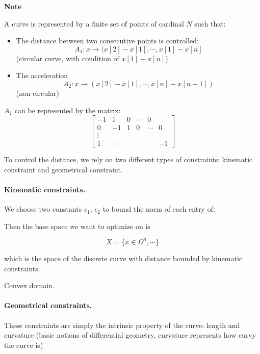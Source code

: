 \documentclass[11pt]{article}
\begin{document}
\setcounter{section}{0}
\thispagestyle{empty}

\begin{center}
{\LARGE \bf Note}\\
\end{center}
A curve is represented by a finite set of points of cardinal $N$ such that:

\begin{itemize}
\item The distance between two consecutive points is controlled:
\[A_1 : x \to (x[2]-x[1], \cdots, x[1]-x[n] \]
(circular curve, with condition of $x[1]-x[n]$)

\item The acceleration
\[A_2: x \to (x[2] - x[1], \cdots, x[n] - x[n-1])\]
(non-circular)
\end{itemize}

$A_1$ can be represented by the matrix:
\[\begin{bmatrix}
    -1 & 1 & 0 & \cdots & 0 \\
    0 & -1 & 1 & 0 & \cdots & 0 \\
    \vdots & & & & & \\
    1 & \cdots & & & & -1
  \end{bmatrix}\]

To control the distance, we rely on two different types of
constraints: kinematic constraint and geometrical constraint.

\paragraph{Kinematic constraints.} We choose two constants $c_1$, $c_2$ to
bound the norm of each entry of:


Then the base space we want to optimize on is 

\[ X = \{ x \in \Omega^n, \cdots  \} \]

which is the space of the discrete curve with distance bounded by
kinematic constraints.

Convex domain.

\paragraph{Geometrical constraints.} These constraints are simply the
intrinsic property of the curve: length and curvature (basic notions
of differential geometry, curvature represents how curvy the curve is)
\end{document}
